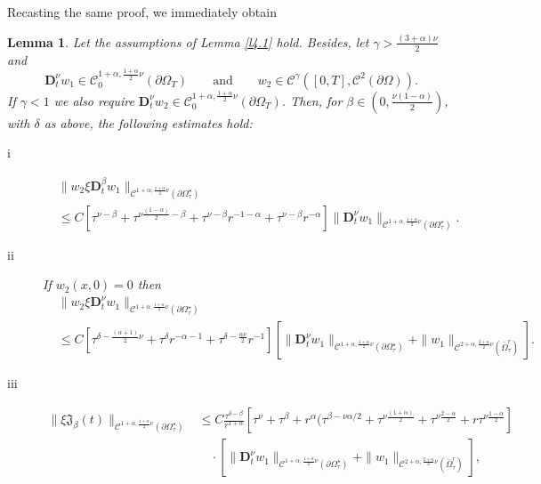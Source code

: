 \documentclass[reqno]{amsart}
\def\C {\mathcal{C}}
\newtheorem{lemma}[proposition]{Lemma}
\theoremstyle{definition}
\numberwithin{equation}{section}
\begin{document}
Recasting the same proof, we immediately obtain

\begin{lemma}\label{l4.1bis}
Let the assumptions of Lemma \ref{l4.1} hold. Besides,
let $\gamma>\frac{(3+\alpha)\nu}{2}$ and
\[
\mathbf{D}_{t}^{\nu}w_1\in\C_{0}^{1+\alpha,\frac{1+\alpha}{2}\nu}(\partial\Omega_{T}) \qquad
\text{and}\qquad w_{2}\in\C^{\gamma}([0,T],\C^{2}(\partial\Omega)).
\]
If $\gamma<1$ we
 also require $\mathbf{D}_{t}^{\nu}w_2\in\C_{0}^{1+\alpha,\frac{1+\alpha}{2}\nu}(\partial\Omega_{T})$.
 Then, for $\beta\in(0,\frac{\nu(1-\alpha)}{2})$, with $\delta$ as above,
 the following estimates hold:
 \begin{description}
	\item[i]
	\begin{align*}
	&\|w_2\xi \mathbf{D}_{t}^{\beta}w_1\|_{\C^{1+\alpha,\frac{1+\alpha}{2}\nu}(\partial\Omega^{\star}_{\tau})}\\&\leq C
		[\tau^{\nu-\beta}+\tau^{\nu\frac{(1-\alpha)}{2}-\beta}+\tau^{\nu-\beta}r^{-1-\alpha}+\tau^{\nu-\beta}r^{-\alpha}]\|\mathbf{D}_{t}^{\nu}w_1\|_{\C^{1+\alpha,\frac{1+\alpha}{2}\nu}(\partial\Omega^{\star}_{\tau})}.
	\end{align*}
		\item[ii] If $w_2(x,0)=0$ then
		\begin{align*}
		&\|w_2\xi \mathbf{D}_{t}^{\nu}w_1\|_{\C^{1+\alpha,\frac{1+\alpha}{2}\nu}(\partial\Omega^{\star}_{\tau})}\\&
		\leq C
		[\tau^{\delta-\frac{(\alpha+1)}{2}\nu}+\tau^{\delta}r^{-\alpha-1}+\tau^{\delta-\frac{\alpha\nu}{2}}r^{-1}][\|\mathbf{D}_{t}^{\nu}w_1\|_{\C^{1+\alpha,\frac{1+\alpha}{2}\nu}(\partial\Omega^{\star}_{\tau})}+\|w_1\|_{\C^{2+\alpha,\frac{2+\alpha}{2}\nu}(\bar{\Omega}^{r}_{\tau})}].
		\end{align*}
		\item[iii]
		\begin{align*}
		\|\xi\mathfrak{J}_{\beta}(t)\|_{\C^{1+\alpha,\frac{1+\alpha}{2}\nu}(\partial\Omega^{\star}_{\tau})}&\leq C
		\frac{\tau^{\delta-\beta}}{r^{1+\alpha}}[\tau^{\nu}+\tau^{\beta}+r^{\alpha}(\tau^{\beta-\nu\alpha/2}+\tau^{\nu\frac{(1+\alpha)}{2}}+\tau^{\nu\frac{2-\alpha}{2}}+r\tau^{\nu\frac{1-\alpha}{2}}]\\
		&
		\quad\cdot
		[\|\mathbf{D}_{t}^{\nu}w_1\|_{\C^{1+\alpha,\frac{1+\alpha}{2}\nu}(\partial\Omega^{\star}_{\tau})}+\|w_1\|_{\C^{2+\alpha,\frac{2+\alpha}{2}\nu}(\bar{\Omega}^{r}_{\tau})}],
		\end{align*}
				\begin{align*}

\end{align*}
\end{description}
\end{lemma}
\end{document}
